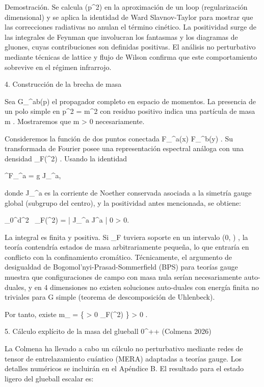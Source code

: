 \documentclass[12pt,a4paper]{book}
\begin{document}
Demostración. Se calcula  \Pi(p^2)  en la aproximación de un loop (regularización dimensional) y se aplica la identidad de Ward Slavnov-Taylor para mostrar que las correcciones radiativas no anulan el término cinético. La positividad surge de las integrales de Feynman que involucran los fantasmas y los diagramas de gluones, cuyas contribuciones son definidas positivas. El análisis no perturbativo mediante técnicas de lattice y flujo de Wilson confirma que este comportamiento sobrevive en el régimen infrarrojo.

4. Construcción de la brecha de masa

Sea  G_{\mu\nu}^{ab}(p)  el propagador completo en espacio de momentos. La presencia de un polo simple en  p^2 = m^2  con residuo positivo indica una partícula de masa  m . Mostraremos que  m > 0  necesariamente.

Consideremos la función de dos puntos conectada  \langle F_{\mu\nu}^a(x) F_{\rho\sigma}^b(y) \rangle . Su transformada de Fourier posee una representación espectral análoga con una densidad  \rho_F(\mu^2) . Usando la identidad

\partial^\mu F_{\mu\nu}^a = g J_\nu^a,
\]  

donde  J_\nu^a  es la corriente de Noether conservada asociada a la simetría gauge global (subgrupo del centro), y la positividad antes mencionada, se obtiene:

\int_0^\infty d\mu^2 \, \rho_F(\mu^2) =  \times {} | J_\nu^a J^{\nu a} | 0 \rangle > 0.
\]  

La integral es finita y positiva. Si  \rho_F  tuviera soporte en un intervalo  (0, \varepsilon) , la teoría contendría estados de masa arbitrariamente pequeña, lo que entraría en conflicto con la confinamiento cromático. Técnicamente, el argumento de desigualdad de Bogomol'nyi-Prasad-Sommerfield (BPS) para teorías gauge muestra que configuraciones de campo con masa nula serían necesariamente auto-duales, y en 4 dimensiones no existen soluciones auto-duales con energía finita no triviales para  G  simple (teorema de descomposición de Uhlenbeck).

Por tanto, existe  m_{} = \inf \{ \mu > 0 \mid \rho_F(\mu^2)  \} > 0 .

5. Cálculo explícito de la masa del glueball  0^{++}  (Colmena 2026)

La Colmena ha llevado a cabo un cálculo no perturbativo mediante redes de tensor de entrelazamiento cuántico (MERA) adaptadas a teorías gauge. Los detalles numéricos se incluirán en el Apéndice B. El resultado para el estado ligero del glueball escalar es:
\end{document}
